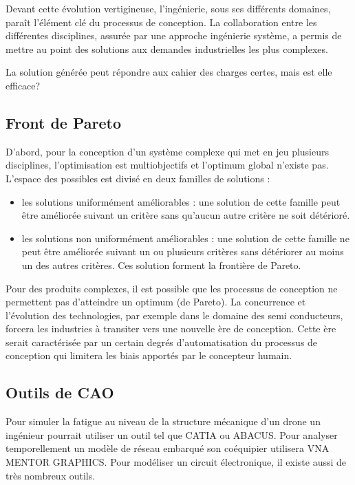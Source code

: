 \documentclass[11pt]{article}
\begin{document}
Devant cette évolution vertigineuse, l'ingénierie, sous ses différents domaines, paraît l'élément clé du processus de conception. La collaboration entre les différentes disciplines, assurée par une approche ingénierie système, a permis de mettre au point des solutions aux demandes industrielles les plus complexes.

La solution générée peut répondre aux cahier des charges certes, mais est elle efficace?

\subsection{Front de Pareto}

D'abord, pour la conception d'un système complexe qui met en jeu plusieurs disciplines, l'optimisation est multiobjectifs et l'optimum global n'existe pas.
L'espace des possibles est divisé en deux familles de solutions :
\begin{itemize}
\item les solutions uniformément améliorables : une solution de cette famille peut être améliorée suivant un critère sans qu'aucun autre critère ne soit détérioré.
\item les solutions non uniformément améliorables : une solution de cette famille ne peut être améliorée suivant un ou plusieurs critères sans détériorer au moins un des autres critères. Ces solution forment la frontière de Pareto.
\end{itemize}

Pour des produits complexes, il est possible que les processus de conception ne permettent pas d'atteindre un optimum (de Pareto). La concurrence et l'évolution des technologies, par exemple dans le domaine des semi conducteurs, forcera les industries à transiter vers une nouvelle ère de conception. Cette ère serait caractérisée par un certain degrés d'automatisation du processus de conception qui limitera les biais apportés par le concepteur humain.

\subsection{Outils de CAO}

Pour simuler la fatigue au niveau de la structure mécanique d'un drone un ingénieur pourrait utiliser un outil tel que CATIA ou ABACUS. Pour analyser temporellement un modèle de réseau embarqué son coéquipier utilisera VNA MENTOR GRAPHICS. Pour modéliser un circuit électronique, il existe aussi de très nombreux outils.
\end{document}
